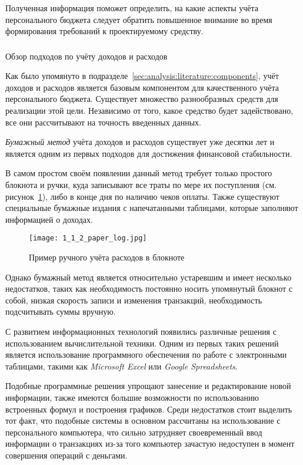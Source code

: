 Полученная информация поможет определить, на какие аспекты учёта персонального бюджета следует обратить повышенное внимание во время формирования требований к проектируемому средству.

\subsubsection{} Обзор подходов по учёту доходов и расходов
\label{sec:analysis:literature:tracking}

Как было упомянуто в подразделе~\ref{sec:analysis:literature:components}, учёт доходов и расходов является базовым компонентом для качественного учёта персонального бюджета.
Существует множество разнообразных средств для реализации этой цели.
Независимо от того, какое средство будет задействовано, все они рассчитывают на точность введенных данных.

\emph{Бумажный метод} учёта доходов и расходов существует уже десятки лет и является одним из первых подходов для достижения финансовой стабильности.

В самом простом своём появлении данный метод требует только простого блокнота и ручки, куда записывают все траты по мере их поступления (см. рисунок~\ref{fig:analysis:literature:paper_log}), либо в конце дня по наличию чеков оплаты.
Также существуют специальные бумажные издания с напечатанными таблицами, которые заполняют информацией о доходах.

\begin{figure}[H]
    \centering
    \texttt{[image: 1\_1\_2\_paper\_log.jpg]}
    \caption{Пример ручного учёта расходов в блокноте}
    \label{fig:analysis:literature:paper_log}
\end{figure}

Однако бумажный метод является относительно устаревшим и имеет несколько недостатков, таких как необходимость постоянно носить упомянутый блокнот с собой, низкая скорость записи и изменения транзакций, необходимость подсчитывать суммы вручную.

С развитием информационных технологий появились различные решения с использованием вычислительной техники.
Одним из первых таких решений является использование программного обеспечения по работе с электронными таблицами, такими как \emph{Microsoft Excel} или \emph{Google Spreadsheets}.

Подобные программные решения упрощают занесение и редактирование новой информации, также имеются большие возможности по использованию встроенных формул и построения графиков.
Среди недостатков стоит выделить тот факт, что подобные системы в основном рассчитаны на использование с персонального компьютера, что сильно затрудняет своевременный ввод информации о транзакциях из-за того компьютер зачастую недоступен в момент совершения операций с деньгами.

